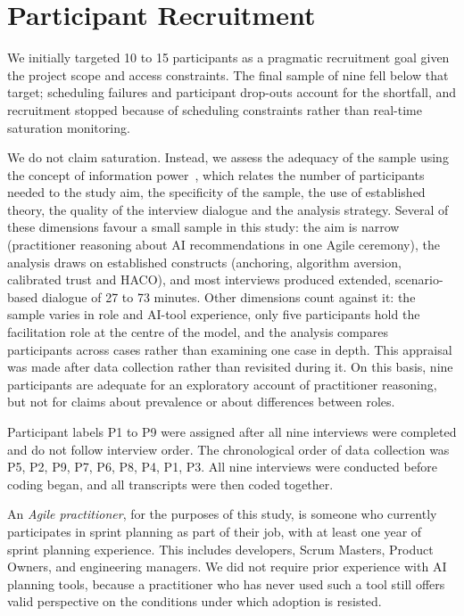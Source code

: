 \documentclass[a4paper,twoside]{bth}
\begin{document}
\section{Participant Recruitment}

We initially targeted 10 to 15 participants as a pragmatic recruitment goal given the project scope and access constraints. The final sample of nine fell below that target; scheduling failures and participant drop-outs account for the shortfall, and recruitment stopped because of scheduling constraints rather than real-time saturation monitoring.

We do not claim saturation. Instead, we assess the adequacy of the sample using the concept of information power~\cite{malterud2016sample}, which relates the number of participants needed to the study aim, the specificity of the sample, the use of established theory, the quality of the interview dialogue and the analysis strategy. Several of these dimensions favour a small sample in this study: the aim is narrow (practitioner reasoning about AI recommendations in one Agile ceremony), the analysis draws on established constructs (anchoring, algorithm aversion, calibrated trust and HACO), and most interviews produced extended, scenario-based dialogue of 27 to 73 minutes. Other dimensions count against it: the sample varies in role and AI-tool experience, only five participants hold the facilitation role at the centre of the model, and the analysis compares participants across cases rather than examining one case in depth. This appraisal was made after data collection rather than revisited during it. On this basis, nine participants are adequate for an exploratory account of practitioner reasoning, but not for claims about prevalence or about differences between roles.

Participant labels P1 to P9 were assigned after all nine interviews were completed and do not follow interview order. The chronological order of data collection was P5, P2, P9, P7, P6, P8, P4, P1, P3. All nine interviews were conducted before coding began, and all transcripts were then coded together.

An \textit{Agile practitioner}, for the purposes of this study, is someone who currently participates in sprint planning as part of their job, with at least one year of sprint planning experience. This includes developers, Scrum Masters, Product Owners, and engineering managers. We did not require prior experience with AI planning tools, because a practitioner who has never used such a tool still offers valid perspective on the conditions under which adoption is resisted.
\end{document}
